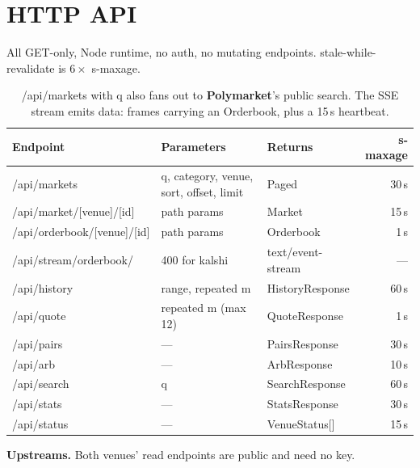 \documentclass[11pt,a4paper]{article}
\newcommand{\code}[1]{{\ttfamily\small #1}}
\newcommand{\PM}{{\color{poly}\textbf{Polymarket}}}
\begin{document}
\section{HTTP API}

All \code{GET}-only, Node runtime, no auth, no mutating endpoints.
\code{stale-while-revalidate} is $6\times$ \code{s-maxage}.

\begin{table}[htbp]
\centering\small
\begin{tabularx}{\textwidth}{@{}p{4.5cm}p{4.2cm}Xr@{}}
\toprule
\textbf{Endpoint} & \textbf{Parameters} & \textbf{Returns} & \textbf{s-maxage} \\
\midrule
\code{/api/markets} & \code{q}, \code{category}, \code{venue}, \code{sort}, \code{offset}, \code{limit}
  & \code{Paged}\allowbreak\code{MarketsResponse} & 30\,s \\
\code{/api/market/[venue]/[id]} & path params & \code{Market} & 15\,s \\
\code{/api/orderbook/[venue]/[id]} & path params & \code{Orderbook} & 1\,s \\
\code{/api/stream/orderbook/}\newline\code{[venue]/[id]} & \code{400} for \code{kalshi}
  & \code{text/event-stream} & --- \\
\code{/api/history} & \code{range}, repeated \code{m} & \code{HistoryResponse} & 60\,s \\
\code{/api/quote} & repeated \code{m} (max 12) & \code{QuoteResponse} & 1\,s \\
\code{/api/pairs} & --- & \code{PairsResponse} & 30\,s \\
\code{/api/arb} & --- & \code{ArbResponse} & 10\,s \\
\code{/api/search} & \code{q} & \code{SearchResponse} & 60\,s \\
\code{/api/stats} & --- & \code{StatsResponse} & 30\,s \\
\code{/api/status} & --- & \code{VenueStatus[]} & 15\,s \\
\bottomrule
\end{tabularx}
\caption{\code{/api/markets} with \code{q} also fans out to \PM{}'s public search. The SSE
stream emits \code{data:} frames carrying an \code{Orderbook}, plus a 15\,s heartbeat.}
\end{table}

\textbf{Upstreams.} Both venues' read endpoints are public and need no key.
\end{document}
